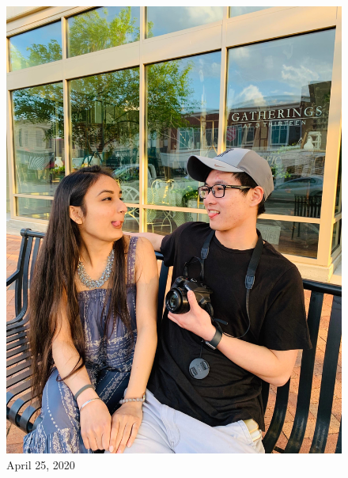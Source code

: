 \documentclass[
]{book}
\begin{document}
\begin{figure}
\centering
\includegraphics[width=5.20833in,height=\textheight]{mimages/0.1 4-25-2020.jpg}
\caption{April 25, 2020}
\end{figure}
\end{document}
